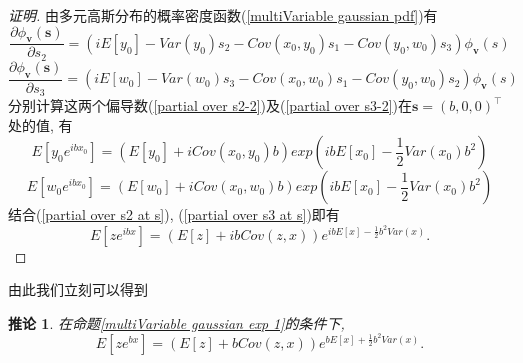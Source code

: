 \documentclass[notitlepage,cs4size,punct,oneside]{ctexrep}
\numberwithin{equation}{section}
\theoremstyle{mystyle}
\newtheorem{corollary}[definition]{\hspace{2em}推论}
\begin{document}
\begin{proof}[证明]
由多元高斯分布的概率密度函数(\ref{multiVariable gaussian pdf})有
\begin{equation} \label{partial over s2-2}
\frac{\partial \phi_\textbf{v}(\textbf{s})}{\partial s_2} = (iE[y_0]-Var(y_0)s_2-Cov(x_0, y_0)s_1-Cov(y_0, w_0)s_3)\phi_{\textbf{v}}(s)
\end{equation}
\begin{equation} \label{partial over s3-2}
\frac{\partial \phi_\textbf{v}(\textbf{s})}{\partial s_3} = (iE[w_0]-Var(w_0)s_3-Cov(x_0, w_0)s_1-Cov(y_0, w_0)s_2)\phi_{\textbf{v}}(s)
\end{equation}
分别计算这两个偏导数(\ref{partial over s2-2})及(\ref{partial over s3-2})在$\textbf{s} = (b, 0, 0)^\top$处的值, 有
\begin{equation} \label{partial over s2 at s}
E\left[y_0e^{ibx_0}\right] = (E[y_0]+iCov(x_0, y_0)b)exp(ibE[x_0] - \frac{1}{2}Var(x_0)b^2)
\end{equation}
\begin{equation} \label{partial over s3 at s}
E\left[w_0e^{ibx_0}\right] = (E[w_0]+iCov(x_0, w_0)b)exp(ibE[x_0] - \frac{1}{2}Var(x_0)b^2)
\end{equation}
结合(\ref{partial over s2 at s}), (\ref{partial over s3 at s})即有
$$E\left[ze^{ibx}\right] = (E[z]+ibCov(z, x))e^{ibE[x]-\frac{1}{2}b^2Var(x)}.$$
\end{proof}
由此我们立刻可以得到
\begin{corollary} \label{multiVariable gaussian exp 2} 在命题\ref{multiVariable gaussian exp 1}的条件下,
$$E\left[ze^{bx}\right] = (E[z]+bCov(z, x))e^{bE[x]+\frac{1}{2}b^2Var(x)}.$$
\end{corollary}
\end{document}
